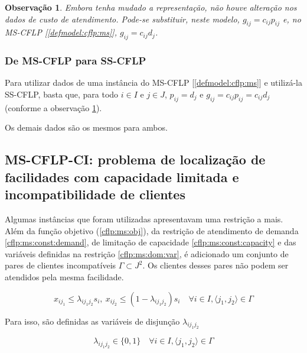 \documentclass[]{article}
\newtheorem{observation}{Observação}
\begin{document}
 			\begin{observation} \label{cflp:ss:obs:gc} 
 				Embora tenha mudado a representação, não houve alteração nos dados de custo de atendimento. 
 				Pode-se substituir, neste modelo, $g_{ij} = c_{ij} p_{ij}$ e, no MS-CFLP [\ref{defmodel:cflp:ms}], $g_{ij} = c_{ij} d_j$.
 			\end{observation}
 		
 			\subsubsection{De MS-CFLP para SS-CFLP} \label{defmodel:cflp:ms:ss}
 				Para utilizar dados de uma instância do MS-CFLP [\ref{defmodel:cflp:ms}] e utilizá-la SS-CFLP, basta que, para todo $i \in I$ e $j \in J$, $p_{ij} = d_j$ e $g_{ij} = c_{ij} p_{ij} = c_{ij} d_j$ (conforme a observação \ref{cflp:ss:obs:gc}).
 				
 				Os demais dados são os mesmos para ambos. 
 				
 			    
 				
 		\subsection{MS-CFLP-CI: problema de localização de facilidades com capacidade limitada e incompatibilidade de clientes} \label{defmodel:cflp:ci}	
 		
 			Algumas instâncias que foram utilizadas apresentavam uma restrição a mais.
 			Além da função objetivo (\ref{cflp:ms:obj}), da restrição de atendimento de demanda \ref{cflp:ms:const:demand}, de limitação de capacidade \ref{cflp:ms:const:capacity} e das variáveis definidas na restrição \ref{cflp:ms:dom:var}, é adicionado um conjunto de pares de clientes incompatíveis $\Gamma \subset J^2$. 
 			Os clientes desses pares não podem ser atendidos pela mesma facilidade.
 			
 			\begin{equation}
 				\label{cflp:ms:ci:const:incomp}		
 					x_{ij_1} \le \lambda_{ij_1j_2} s_i, 
 					\ x_{ij_2} \le (1 - \lambda_{ij_1j_2}) s_i 
 					\quad
 					\forall i \in I, \langle j_1, j_2 \rangle \in \Gamma  				
 			\end{equation} 
 		
 			Para isso, são definidas as variáveis de disjunção $\lambda_{ij_1j_2}$
 			
 			\begin{equation}
 				\label{cflp:ms:ci:dom:var}		
 				\lambda_{ij_1j_2} \in \{ 0, 1 \}	
 				\quad
 				\forall i \in I, \langle j_1, j_2 \rangle \in \Gamma	
 			\end{equation}
\fi
\end{document}
